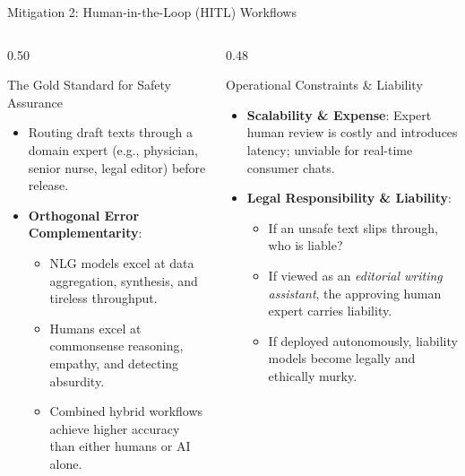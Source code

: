\documentclass[aspectratio=169, 10pt]{beamer}
\begin{document}
\begin{frame}{Mitigation 2: Human-in-the-Loop (HITL) Workflows}
  \begin{columns}[T]
    \begin{column}{0.50\textwidth}
      \begin{block}{The Gold Standard for Safety Assurance}
        \begin{itemize}
          \item Routing draft texts through a domain expert (e.g., physician, senior nurse, legal editor) before release.
          \item \textbf{Orthogonal Error Complementarity}:
          \begin{itemize}
            \item NLG models excel at data aggregation, synthesis, and tireless throughput.
            \item Humans excel at commonsense reasoning, empathy, and detecting absurdity.
            \item Combined hybrid workflows achieve higher accuracy than either humans or AI alone.
          \end{itemize}
        \end{itemize}
      \end{block}
    \end{column}

    \begin{column}{0.48\textwidth}
      \begin{alertbox}{Operational Constraints \& Liability}
        \begin{itemize}
          \item \textbf{Scalability \& Expense}: Expert human review is costly and introduces latency; unviable for real-time consumer chats.
          \item \textbf{Legal Responsibility \& Liability}:
          \begin{itemize}
            \item If an unsafe text slips through, who is liable?
            \item If viewed as an \textit{editorial writing assistant}, the approving human expert carries liability.
            \item If deployed autonomously, liability models become legally and ethically murky.
          \end{itemize}
        \end{itemize}
      \end{alertbox}
    \end{column}
  \end{columns}
\end{frame}
\end{document}
